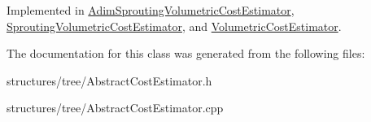 Implemented in \hyperlink{class_adim_sprouting_volumetric_cost_estimator_aa776aae78d397d422ff6b8041c07c412}{Adim\+Sprouting\+Volumetric\+Cost\+Estimator}, \hyperlink{class_sprouting_volumetric_cost_estimator_a712cbceabb8a8f63521af8d31010f955}{Sprouting\+Volumetric\+Cost\+Estimator}, and \hyperlink{class_volumetric_cost_estimator_a0ff762e6a26e1c6937cc28e88d1dc24d}{Volumetric\+Cost\+Estimator}.



The documentation for this class was generated from the following files\+:\begin{DoxyCompactItemize}
\item 
structures/tree/Abstract\+Cost\+Estimator.\+h\item 
structures/tree/Abstract\+Cost\+Estimator.\+cpp\end{DoxyCompactItemize}
